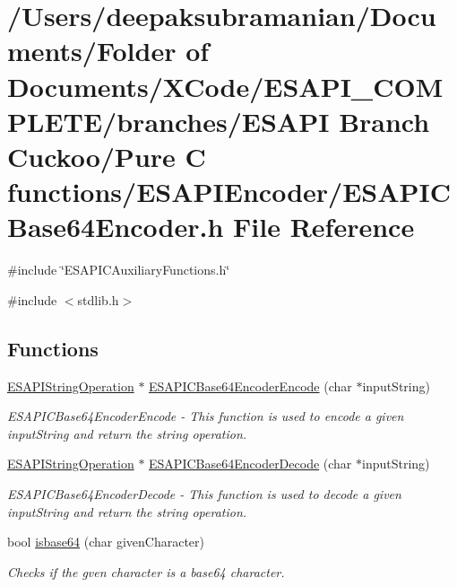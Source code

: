 \hypertarget{a00007}{
\section{/Users/deepaksubramanian/Documents/Folder of Documents/XCode/ESAPI\_\-COMPLETE/branches/ESAPI Branch Cuckoo/Pure C functions/ESAPIEncoder/ESAPICBase64Encoder.h File Reference}
\label{de/d5e/a00007}
}
{\ttfamily \#include \char`\"{}ESAPICAuxiliaryFunctions.h\char`\"{}}\par
{\ttfamily \#include $<$stdlib.h$>$}\par
\subsection*{Functions}
\begin{DoxyCompactItemize}
\item 
\hyperlink{a00002}{ESAPIStringOperation} $\ast$ \hyperlink{a00007_a89aaefabce9c6d0abf9bfa83d53c2126}{ESAPICBase64EncoderEncode} (char $\ast$inputString)
\begin{DoxyCompactList}\small\item\em ESAPICBase64EncoderEncode -\/ This function is used to encode a given inputString and return the string operation. \end{DoxyCompactList}\item 
\hyperlink{a00002}{ESAPIStringOperation} $\ast$ \hyperlink{a00007_a3be3ccff3afe8d96d3e381febc3b61c4}{ESAPICBase64EncoderDecode} (char $\ast$inputString)
\begin{DoxyCompactList}\small\item\em ESAPICBase64EncoderDecode -\/ This function is used to decode a given inputString and return the string operation. \end{DoxyCompactList}\item 
bool \hyperlink{a00007_afaf89639d27c67e0a3ee705d9d170fc0}{isbase64} (char givenCharacter)
\begin{DoxyCompactList}\small\item\em Checks if the gven character is a base64 character. \end{DoxyCompactList}\end{DoxyCompactItemize}


